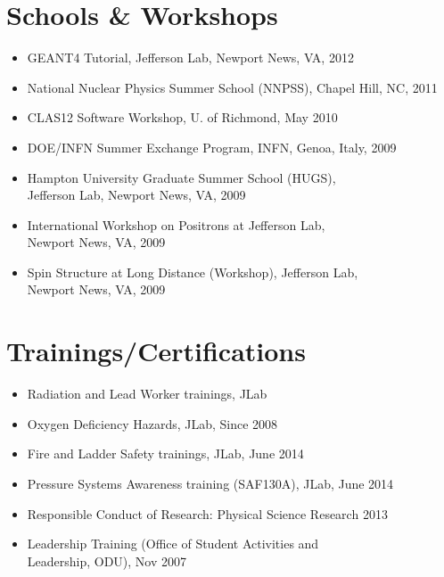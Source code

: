 \documentclass[10pt, letterpaper]{article}
\begin{document}
\section*{Schools \& Workshops}
\noindent
\begin{itemize} 
\item GEANT4 Tutorial, Jefferson Lab, Newport News, VA,  \hfill 2012
\item National Nuclear Physics Summer School (NNPSS), Chapel Hill, NC,  \hfill 2011
\item CLAS12 Software Workshop, U. of Richmond, \hfill May 2010 %
\item DOE/INFN Summer Exchange Program, INFN, Genoa, Italy,  \hfill 2009
\item Hampton University Graduate Summer School (HUGS), \\
\hspace*{3 mm} Jefferson Lab, Newport News, VA,  \hfill 2009
\item International Workshop on Positrons at Jefferson Lab, \\
\hspace*{3 mm} Newport News, VA,  \hfill 2009 %
\item Spin Structure at Long Distance (Workshop), Jefferson Lab, \\
\hspace*{3 mm} Newport News, VA,  \hfill 2009
\end{itemize}



\section*{Trainings/Certifications}
\noindent
\begin{itemize}
\item Radiation and Lead Worker trainings, JLab
\item Oxygen Deficiency Hazards, JLab, \hfill Since 2008
\item Fire and Ladder Safety trainings, JLab, \hfill June 2014
\item Pressure Systems Awareness training (SAF130A), JLab, \hfill June 2014
\item Responsible Conduct of Research: Physical Science Research \hfill 2013
\item Leadership Training (Office of Student Activities and \\
\hspace*{3 mm} Leadership, ODU), \hfill Nov 2007
\end{itemize}
\end{document}
